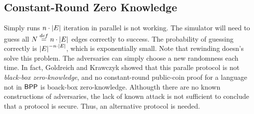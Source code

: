 \subsection{Constant-Round Zero Knowledge}
Simply runs $n\cdot\left|E\right|$ iteration in parallel is not working. The simulator will need to guess all $N\stackrel{def}{=} n\cdot\left|E\right|$ edges correctly to success. The probability of guessing correctly is $\left|E\right|^{-n\cdot\left|E\right|}$, which is exponentially small. Note that rewinding doesn's solve this problem. The adversaries can simply choose a new randomness each time. In fact, Goldreich and Krawczyk showed that this paralle protocol is not {\it black-box zero-knowledge}, and no constant-round public-coin proof for a language not in ${\sf BPP}$ is boack-box zero-knowledge. Althougth there are no known constructions of adversaries, the lack of known attack is not sufficient to conclude that a protocol is secure. Thus, an alternative protocol is needed.

